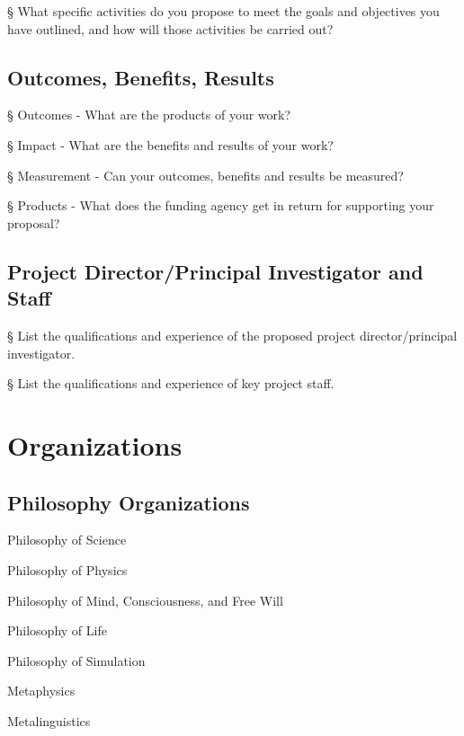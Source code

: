 § What specific activities do you propose to meet the goals and
objectives you have outlined, and how will those activities be carried
out?

\hypertarget{outcomes-benefits-results-1}{%
\subsection{Outcomes, Benefits,
Results}\label{outcomes-benefits-results-1}}

§ Outcomes - What are the products of your work?

§ Impact - What are the benefits and results of your work?

§ Measurement - Can your outcomes, benefits and results be measured?

§ Products - What does the funding agency get in return for supporting
your proposal?

\hypertarget{project-directorprincipal-investigator-and-staff-1}{%
\subsection{Project Director/Principal Investigator and
Staff}\label{project-directorprincipal-investigator-and-staff-1}}

§ List the qualifications and experience of the proposed project
director/principal investigator.

§ List the qualifications and experience of key project staff.

\hypertarget{organizations}{%
\section{Organizations}\label{organizations}}

\hypertarget{philosophy-organizations}{%
\subsection{Philosophy Organizations}\label{philosophy-organizations}}

Philosophy of Science

Philosophy of Physics

Philosophy of Mind, Consciousness, and Free Will

Philosophy of Life

Philosophy of Simulation

Metaphysics

Metalinguistics


